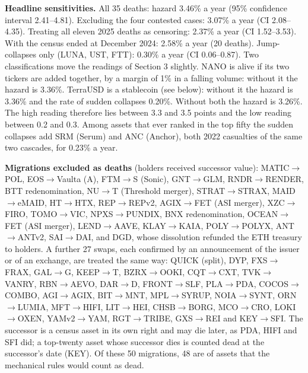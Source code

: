 \documentclass[11pt]{article}
\begin{document}
\textbf{Headline sensitivities.} All 35 deaths: hazard 3.46\% a year (95\% confidence interval 2.41--4.81). Excluding the four contested cases: 3.07\% a year (CI 2.08--4.35). Treating all eleven 2025 deaths as censoring: 2.37\% a year (CI 1.52--3.53). With the census ended at December 2024: 2.58\% a year (20 deaths). Jump-collapses only (LUNA, UST, FTT): 0.30\% a year (CI 0.06--0.87). Two classifications move the readings of Section 3 slightly. NANO is alive if its two tickers are added together, by a margin of 1\% in a falling volume: without it the hazard is 3.36\%. TerraUSD is a stablecoin (see below): without it the hazard is 3.36\% and the rate of sudden collapses 0.20\%. Without both the hazard is 3.26\%. The high reading therefore lies between 3.3 and 3.5 points and the low reading between 0.2 and 0.3. Among assets that ever ranked in the top fifty the sudden collapses add SRM (Serum) and ANC (Anchor), both 2022 casualties of the same two cascades, for 0.23\% a year.

{\raggedright \textbf{Migrations excluded as deaths} (holders received successor value): MATIC$\to$POL, EOS$\to$Vaulta (A), FTM$\to$S (Sonic), GNT$\to$GLM, RNDR$\to$RENDER, BTT redenomination, NU$\to$T (Threshold merger), STRAT$\to$STRAX, MAID$\to$eMAID, HT$\to$HTX, REP$\to$REPv2, AGIX$\to$FET (ASI merger), XZC$\to$FIRO, TOMO$\to$VIC, NPXS$\to$PUNDIX, BNX redenomination, OCEAN$\to$FET (ASI merger), LEND$\to$AAVE, KLAY$\to$KAIA, POLY$\to$POLYX, ANT$\to$ANTv2, SAI$\to$DAI, and DGD, whose dissolution refunded the ETH treasury to holders. A further 27 swaps, each confirmed by an announcement of the issuer or of an exchange, are treated the same way: QUICK (split), DYP, FXS$\to$FRAX, GAL$\to$G, KEEP$\to$T, BZRX$\to$OOKI, CQT$\to$CXT, TVK$\to$VANRY, RBN$\to$AEVO, DAR$\to$D, FRONT$\to$SLF, PLA$\to$PDA, COCOS$\to$COMBO, AGI$\to$AGIX, BIT$\to$MNT, MPL$\to$SYRUP, NOIA$\to$SYNT, ORN$\to$LUMIA, MFT$\to$HIFI, LIT$\to$HEI, CHSB$\to$BORG, MCO$\to$CRO, LOKI$\to$OXEN, YAMv2$\to$YAM, RGT$\to$TRIBE, GXS$\to$REI and KEY$\to$SFI. The successor is a census asset in its own right and may die later, as PDA, HIFI and SFI did; a top-twenty asset whose successor dies is counted dead at the successor's date (KEY). Of these 50 migrations, 48 are of assets that the mechanical rules would count as dead.\par}
\end{document}
